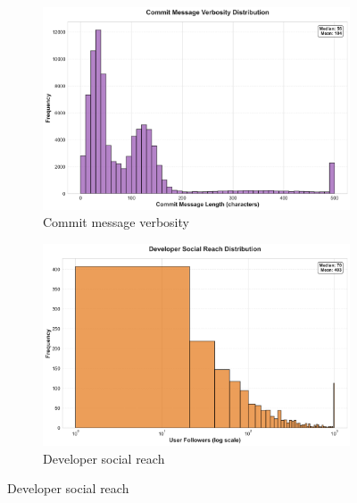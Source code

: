 \documentclass[11pt]{article}
\begin{document}
\begin{figure}[H]
\centering
\begin{subfigure}[b]{0.48\textwidth}
\centering
\includegraphics[width=\textwidth]{figures_individual/37_entity_commit_message_verbosity.png}
\caption{Commit message verbosity}
\label{fig:entity_commits}
\end{subfigure}
\hfill
\begin{subfigure}[b]{0.48\textwidth}
\centering
\includegraphics[width=\textwidth]{figures_individual/38_entity_developer_social_reach.png}
\caption{Developer social reach}
\label{fig:entity_social}
\end{subfigure}

\vspace{0.2cm}


\end{figure}
\end{document}
